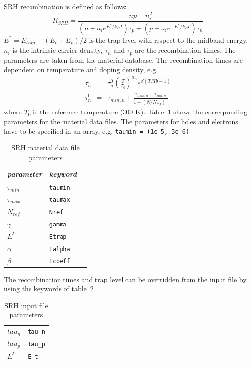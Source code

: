 SRH recombination is defined as follows:
\begin{equation}
R_{SRH} = \frac{np - n_i^2}{(n + n_i e^{E^*/k_BT})\tau_p +
    (p + n_i e^{-E^*/k_BT})\tau_n}
\end{equation}
$E^* = E_{trap} - (E_c + E_v)/2$ is the trap level with respect to the midband energy. $n_i$ is the intrinsic carrier density, $\tau_n$ and $\tau_p$ are the recombination times.
The parameters are taken from the material database.
The recombination times are dependent on temperature and doping density, e.g.
\begin{eqnarray}
\tau_n & = & \tau_n^0 \left(\frac{T}{T_0}\right)^{\alpha_n} e^{\beta(T/T0 - 1)} \\
\tau_n^0 & = & \tau_{min,n} + \frac{\tau_{max,n} - 
     \tau_{min,n}}{1 + (N/N_{ref})^\gamma}
\end{eqnarray}
where $T_0$ is the reference temperature (300 K).
Table~\ref{table:srh_params_db} shows the corresponding parameters for the material data files.
The parameters for holes and electrons have to be specified in an array, e.g. \verb+taumin = (1e-5, 3e-6)+
\begin{table}[htb]
\center
\begin{tabular}{l||l|l}
\textit{parameter} & \textit{keyword} \\
\hline\hline
$\tau_{min}$ & \texttt{taumin} \\
$\tau_{max}$ & \texttt{taumax} \\
$N_{ref}$ & \texttt{Nref} \\
$\gamma$ & \texttt{gamma} \\
$E^*$ & \texttt{Etrap} \\
$\alpha$ & \texttt{Talpha} \\
$\beta$ & \texttt{Tcoeff} \\
\end{tabular}
\caption{SRH material data file parameters}
\label{table:srh_params_db}
\end{table}

The recombination times and trap level can be overridden from the input file by using the keywords of table~\ref{table:srh_params_input}.
\begin{table}[htb]
\center
\begin{tabular}{l||l}
$tau_n$ & \texttt{tau\_n} \\
$tau_p$ & \texttt{tau\_p} \\
$E^*$ & \texttt{E\_t}
\end{tabular}
\caption{SRH input file parameters}
\label{table:srh_params_input}
\end{table}

